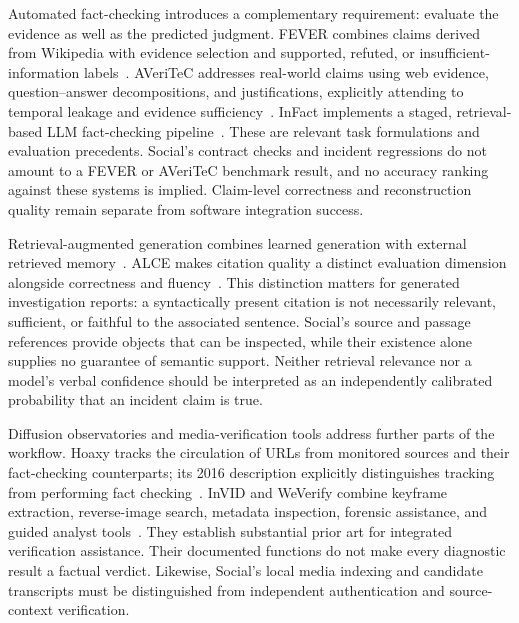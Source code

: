Automated fact-checking introduces a complementary requirement: evaluate the
evidence as well as the predicted judgment. FEVER combines claims derived from
Wikipedia with evidence selection and supported, refuted, or insufficient-information
labels~\cite{thorne2018fever}. AVeriTeC addresses real-world claims using web
evidence, question--answer decompositions, and justifications, explicitly attending
to temporal leakage and evidence sufficiency~\cite{schlichtkrull2023averitec}.
InFact implements a staged, retrieval-based LLM fact-checking
pipeline~\cite{rothermel2024infact}. These are relevant task formulations and
evaluation precedents. Social's contract checks and incident regressions do not
amount to a FEVER or AVeriTeC benchmark result, and no accuracy ranking against
these systems is implied. Claim-level correctness and reconstruction quality
remain separate from software integration success.

Retrieval-augmented generation combines learned generation with external
retrieved memory~\cite{lewis2020rag}. ALCE makes citation quality a distinct
evaluation dimension alongside correctness and
fluency~\cite{gao2023alce}. This distinction matters for generated investigation
reports: a syntactically present citation is not necessarily relevant, sufficient,
or faithful to the associated sentence. Social's source and passage references
provide objects that can be inspected, while their existence alone supplies no
guarantee of semantic support. Neither retrieval relevance nor a model's verbal
confidence should be interpreted as an independently calibrated probability that
an incident claim is true.

Diffusion observatories and media-verification tools address further parts of
the workflow. Hoaxy tracks the circulation of URLs from monitored sources and
their fact-checking counterparts; its 2016 description explicitly distinguishes
tracking from performing fact checking~\cite{shao2016hoaxy}. InVID and WeVerify
combine keyframe extraction, reverse-image search, metadata inspection, forensic
assistance, and guided analyst tools~\cite{invidVerificationPlugin,weverifyVerificationPlugin}.
They establish substantial prior art for integrated verification assistance.
Their documented functions do not make every diagnostic result a factual
verdict. Likewise, Social's local media indexing and candidate transcripts must
be distinguished from independent authentication and source-context verification.

